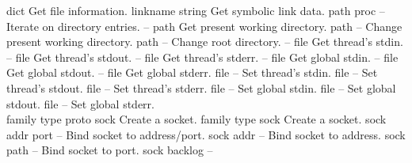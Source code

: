 \begin{longtable}{}
	{dict}
	{Get file information.}
\hline
\optableent
	{linkname}
	{{\bf {}}}
	{string}
	{Get symbolic link data.}
\hline
\optableent
	{path proc}
	{{\bf {}}}
	{--}
	{Iterate on directory entries.}
\hline
\optableent
	{--}
	{{\bf {}}}
	{path}
	{Get present working directory.}
\hline
\optableent
	{path}
	{{\bf {}}}
	{--}
	{Change present working directory.}
\hline
\optableent
	{path}
	{{\bf {}}}
	{--}
	{Change root directory.}
\hline
\optableent
	{--}
	{{\bf {}}}
	{file}
	{Get thread's stdin.}
\hline
\optableent
	{--}
	{{\bf {}}}
	{file}
	{Get thread's stdout.}
\hline
\optableent
	{--}
	{{\bf {}}}
	{file}
	{Get thread's stderr.}
\hline
\optableent
	{--}
	{{\bf {}}}
	{file}
	{Get global stdin.}
\hline
\optableent
	{--}
	{{\bf {}}}
	{file}
	{Get global stdout.}
\hline
\optableent
	{--}
	{{\bf {}}}
	{file}
	{Get global stderr.}
\hline
\optableent
	{file}
	{{\bf {}}}
	{--}
	{Set thread's stdin.}
\hline
\optableent
	{file}
	{{\bf {}}}
	{--}
	{Set thread's stdout.}
\hline
\optableent
	{file}
	{{\bf {}}}
	{--}
	{Set thread's stderr.}
\hline
\optableent
	{file}
	{{\bf {}}}
	{--}
	{Set global stdin.}
\hline
\optableent
	{file}
	{{\bf {}}}
	{--}
	{Set global stdout.}
\hline
\optableent
	{file}
	{{\bf {}}}
	{--}
	{Set global stderr.}
\hline \hline
{} \\
\hline \hline
\optableent
	{family type proto}
	{{\bf {}}}
	{sock}
	{Create a socket.}
\optableent
	{family type}
	{{\bf {}}}
	{sock}
	{Create a socket.}
\hline
\optableent
	{sock addr port}
	{{\bf {}}}
	{--}
	{Bind socket to address/port.}
\optableent
	{sock addr}
	{{\bf {}}}
	{--}
	{Bind socket to address.}
\optableent
	{sock path}
	{{\bf {}}}
	{--}
	{Bind socket to port.}
\hline
\optableent
	{sock backlog}
	{{\bf {}}}
	{--}

\end{longtable}
